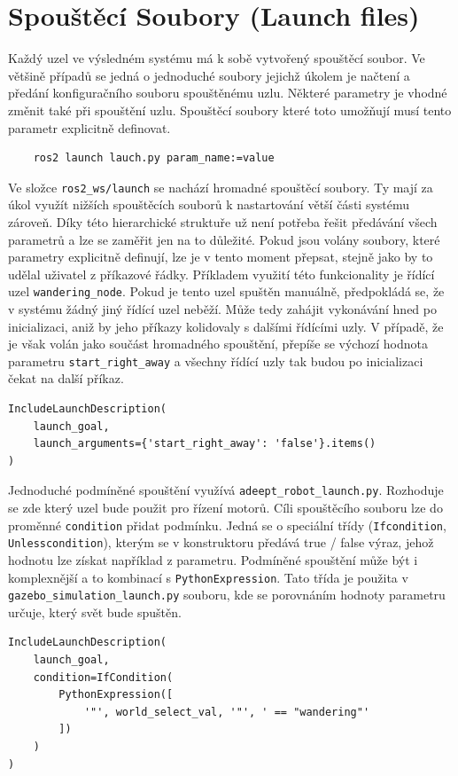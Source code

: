 \section{Spouštěcí Soubory (Launch files)}
Každý uzel ve výsledném systému má k sobě vytvořený spouštěcí soubor. Ve většině případů se jedná o jednoduché soubory jejichž úkolem je načtení a předání konfiguračního souboru spouštěnému uzlu. Některé parametry je vhodné změnit také při spouštění uzlu. Spouštěcí soubory které toto umožňují musí tento parametr explicitně definovat.
\begin{verbatim}
	ros2 launch lauch.py param_name:=value
\end{verbatim}
Ve složce \verb|ros2_ws/launch| se nachází hromadné spouštěcí soubory. Ty mají za úkol využít nižších spouštěcích souborů k nastartování větší části systému zároveň. Díky této hierarchické struktuře už není potřeba řešit předávání všech parametrů a lze se zaměřit jen na to důležité. Pokud jsou volány soubory, které parametry explicitně definují, lze je v tento moment přepsat, stejně jako by to udělal uživatel z příkazové řádky. Příkladem využití této funkcionality je řídící uzel \verb|wandering_node|. Pokud je tento uzel spuštěn manuálně, předpokládá se, že v systému žádný jiný řídící uzel neběží. Může tedy zahájit vykonávání hned po inicializaci, aniž by jeho příkazy kolidovaly s dalšími řídícími uzly. V případě, že je však volán jako součást hromadného spouštění, přepíše se výchozí hodnota parametru \verb|start_right_away| a všechny řídící uzly tak budou po inicializaci čekat na další příkaz.
\begin{verbatim}
IncludeLaunchDescription(
    launch_goal,
    launch_arguments={'start_right_away': 'false'}.items()
)
\end{verbatim}

Jednoduché podmíněné spouštění využívá \verb|adeept_robot_launch.py|. Rozhoduje se zde který uzel bude použit pro řízení motorů. Cíli spouštěcího souboru lze do proměnné \verb|condition| přidat podmínku. Jedná se o speciální třídy (\verb|Ifcondition|, \verb|Unlesscondition|), kterým se v konstruktoru předává true / false výraz, jehož hodnotu lze získat například z parametru. Podmíněné spouštění může být i komplexnější a to kombinací s \verb|PythonExpression|. Tato třída je použita v \verb|gazebo_simulation_launch.py| souboru, kde se porovnáním hodnoty parametru určuje, který svět bude spuštěn.
\begin{verbatim}
IncludeLaunchDescription(
    launch_goal,
    condition=IfCondition(
        PythonExpression([
            '"', world_select_val, '"', ' == "wandering"'
        ])
    )
)
\end{verbatim}

